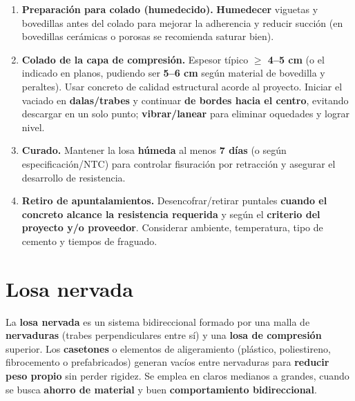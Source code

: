 \documentclass[12pt]{article}
\begin{document}
\begin{enumerate}
		\item \textbf{Preparación para colado (humedecido).} \textbf{Humedecer} viguetas y bovedillas antes del colado para mejorar la adherencia y reducir succión (en bovedillas cerámicas o porosas se recomienda saturar bien).
		\item \textbf{Colado de la capa de compresión.} Espesor típico \textbf{$\geq$ 4--5 cm} (o el indicado en planos, pudiendo ser \textbf{5--6 cm} según material de bovedilla y peraltes). Usar concreto de calidad estructural acorde al proyecto. Iniciar el vaciado en \textbf{dalas/trabes} y continuar \textbf{de bordes hacia el centro}, evitando descargar en un solo punto; \textbf{vibrar/lanear} para eliminar oquedades y lograr nivel.
		\item \textbf{Curado.} Mantener la losa \textbf{húmeda} al menos \textbf{7 días} (o según especificación/NTC) para controlar fisuración por retracción y asegurar el desarrollo de resistencia.
		\item \textbf{Retiro de apuntalamientos.} Desencofrar/retirar puntales \textbf{cuando el concreto alcance la resistencia requerida} y según el \textbf{criterio del proyecto y/o proveedor}. Considerar ambiente, temperatura, tipo de cemento y tiempos de fraguado.
	\end{enumerate}
	

	
	
	
	

	

	
	
	
	
	
	
	
	
	
	
	
	\section{Losa nervada }
	
	
	La \textbf{losa nervada} es un sistema bidireccional formado por una malla de \textbf{nervaduras} (trabes perpendiculares entre sí) y una \textbf{losa de compresión} superior. Los \textbf{casetones} o elementos de aligeramiento (plástico, poliestireno, fibrocemento o prefabricados) generan vacíos entre nervaduras para \textbf{reducir peso propio} sin perder rigidez. Se emplea en claros medianos a grandes, cuando se busca \textbf{ahorro de material} y buen \textbf{comportamiento bidireccional}.
	
\end{document}
